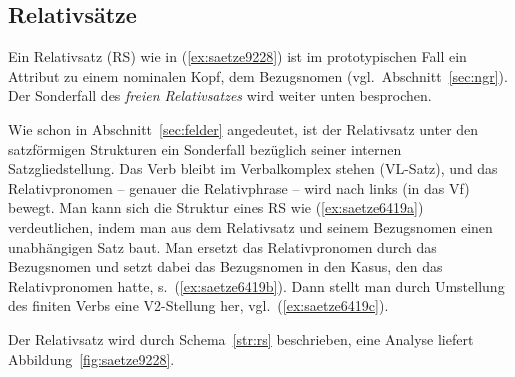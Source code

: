 \subsection{Relativsätze}

\label{sec:relativsaetze}

Ein Relativsatz (RS) wie in (\ref{ex:saetze9228}) ist im prototypischen Fall ein Attribut zu einem nominalen Kopf, dem Bezugsnomen (vgl.\ Abschnitt~\ref{sec:ngr}).
Der Sonderfall des \textit{freien Relativsatzes} wird weiter unten besprochen.

\begin{exe}
\end{exe}

Wie schon in Abschnitt~\ref{sec:felder} angedeutet, ist der Relativsatz unter den satzförmigen Strukturen ein Sonderfall bezüglich seiner internen Satzgliedstellung.
Das Verb bleibt im Verbalkomplex stehen (VL-Satz), und das Relativpronomen -- genauer die Relativphrase -- wird nach links (in das Vf) bewegt.
Man kann sich die Struktur eines RS wie (\ref{ex:saetze6419a}) verdeutlichen, indem man aus dem Relativsatz und seinem Bezugsnomen einen unabhängigen Satz baut.
Man ersetzt das Relativpronomen durch das Bezugsnomen und setzt dabei das Bezugsnomen in den Kasus, den das Relativpronomen hatte, s.\ (\ref{ex:saetze6419b}). 
Dann stellt man durch Umstellung des finiten Verbs eine V2-Stellung her, vgl.\ (\ref{ex:saetze6419c}).

\begin{exe}
  \ex\label{ex:saetze6419}
  \begin{xlist}
  \end{xlist}
\end{exe}

Der Relativsatz wird durch Schema~\ref{str:rs} beschrieben, eine Analyse liefert Abbildung~\ref{fig:saetze9228}.



